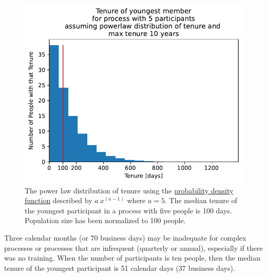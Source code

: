 \begin{figure}[!htb] %
    \centering %
    \includegraphics[width=1\textwidth]{images/tenure_power_distribution_a5_with_max_tenure10_and_5_participants.pdf}
    \caption{The power law distribution of tenure using the \href{https://en.wikipedia.org/wiki/Probability_density_function}{probability density function}
    described by $a\ x^{(a-1)}$ where $a=5$. The median tenure of the youngest participant  in a process with five people is 100 days. Population size has been normalized to 100 people.}
    \label{fig:tenure-powerlaw-5-participants-tenure10}
\end{figure}


Three calendar months (or 70 business days) may be inadequate for complex processes or processes that are infrequent (quarterly or annual), especially if there was no training. When the number of participants is ten people, then the median tenure of the youngest participant is 51 calendar days (37 business days).

\ \\

